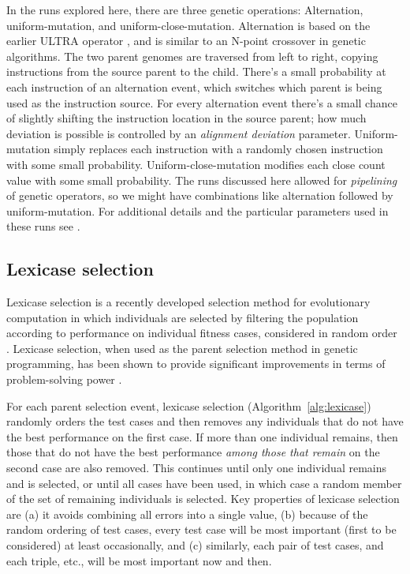 In the runs explored here, there are three genetic operations: Alternation, uniform-mutation, and 
uniform-close-mutation.
Alternation is based on the earlier ULTRA operator \citep{Spector:2013:GPTP:new}, 
and is similar to an N-point crossover in 
genetic algorithms. The two parent genomes
are traversed from left to right, copying instructions from the source parent to the child. There's
a small probability at each instruction of an alternation event, which switches which parent is being 
used as the instruction source. For every alternation event there's a small chance of slightly shifting 
the instruction location in the source parent; how much deviation is possible is controlled by an 
\emph{alignment deviation} parameter. 
Uniform-mutation simply replaces each instruction with a randomly chosen instruction with some
small probability. Uniform-close-mutation modifies each close count value with some small probability.
The runs discussed here allowed for \emph{pipelining} of genetic operators, so we might have
combinations like alternation followed by uniform-mutation.
For additional details and the particular parameters used in these runs see \citep{Helmuth:2015:GECCO}.

\subsection{Lexicase selection}

Lexicase selection is a recently developed selection method for evolutionary computation in which 
individuals are selected by filtering the population according to performance on individual 
fitness cases, considered in random order \citep{Spector:2012:GECCOcompA}. Lexicase 
selection, when used as the parent selection method in genetic programming, has been shown to provide 
significant improvements in terms of problem-solving power \citep{Helmuth:2015:ieeeTEC, Helmuth:2015:GECCO}. 

For each parent selection event, lexicase selection (Algorithm~\ref{alg:lexicase})
randomly orders the test cases and then removes any individuals  
that do not have the best performance on the first case. 
If more than one individual remains, then those that do not have the best performance 
\emph{among those that remain} on the second case are 
also removed. This 
continues until only one individual remains and is selected, or until all cases 
have been used, in which case a random member of the set of remaining individuals is selected.
Key properties of lexicase selection are (a) it avoids combining all  errors into a single
value, (b) because of the random ordering of test cases, every test case will be
most important (first to be considered) at least occasionally, and (c) similarly, each pair of test cases, 
and each triple, etc., will be most important now and then. 

